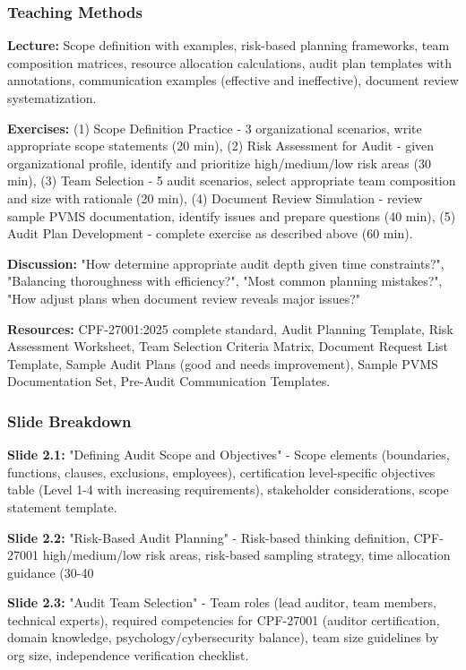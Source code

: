\documentclass[11pt,a4paper]{article}
\begin{document}
\subsubsection{Teaching Methods}
\textbf{Lecture:} Scope definition with examples, risk-based planning frameworks, team composition matrices, resource allocation calculations, audit plan templates with annotations, communication examples (effective and ineffective), document review systematization.

\textbf{Exercises:} (1) Scope Definition Practice - 3 organizational scenarios, write appropriate scope statements (20 min), (2) Risk Assessment for Audit - given organizational profile, identify and prioritize high/medium/low risk areas (30 min), (3) Team Selection - 5 audit scenarios, select appropriate team composition and size with rationale (20 min), (4) Document Review Simulation - review sample PVMS documentation, identify issues and prepare questions (40 min), (5) Audit Plan Development - complete exercise as described above (60 min).

\textbf{Discussion:} "How determine appropriate audit depth given time constraints?", "Balancing thoroughness with efficiency?", "Most common planning mistakes?", "How adjust plans when document review reveals major issues?"

\textbf{Resources:} CPF-27001:2025 complete standard, Audit Planning Template, Risk Assessment Worksheet, Team Selection Criteria Matrix, Document Request List Template, Sample Audit Plans (good and needs improvement), Sample PVMS Documentation Set, Pre-Audit Communication Templates.

\subsubsection{Slide Breakdown}

\textbf{Slide 2.1:} "Defining Audit Scope and Objectives" - Scope elements (boundaries, functions, clauses, exclusions, employees), certification level-specific objectives table (Level 1-4 with increasing requirements), stakeholder considerations, scope statement template.

\textbf{Slide 2.2:} "Risk-Based Audit Planning" - Risk-based thinking definition, CPF-27001 high/medium/low risk areas, risk-based sampling strategy, time allocation guidance (30-40%

\textbf{Slide 2.3:} "Audit Team Selection" - Team roles (lead auditor, team members, technical experts), required competencies for CPF-27001 (auditor certification, domain knowledge, psychology/cybersecurity balance), team size guidelines by org size, independence verification checklist.
\end{document}

